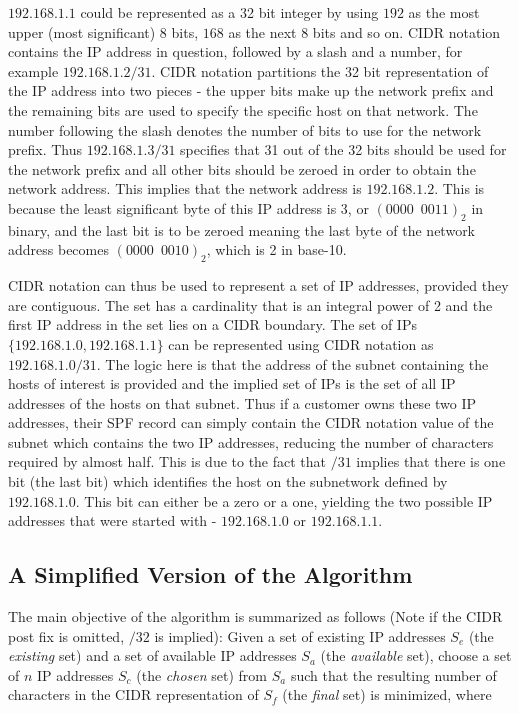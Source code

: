 $192.168.1.1$ could be represented as a 32 bit integer by using $192$ as the most upper (most significant) 8 bits, $168$ as the next 8 bits and so on. CIDR notation contains the IP address in question, followed by a slash and a number, for example $192.168.1.2/31$. CIDR notation partitions the 32 bit representation of the IP address into two pieces - the upper bits make up the network prefix and the remaining bits are used to specify the specific host on that network. The number following the slash denotes the number of bits to use for the network prefix. Thus $192.168.1.3/31$ specifies that 31 out of the 32 bits should be used for the network prefix and all other bits should be zeroed in order to obtain the network address. This implies that the network address is $192.168.1.2$. This is because the least significant byte of this IP address is 3, or $(0000\enspace0011)_2$ in binary, and the last bit is to be zeroed meaning the last byte of the network address becomes $(0000\enspace0010)_2$, which is 2 in base-10. 

CIDR notation can thus be used to represent a set of IP addresses, provided they are contiguous. The set has a cardinality that is an integral power of 2 and the first IP address in the set lies on a CIDR boundary. The set of IPs $\{192.168.1.0, 192.168.1.1\}$ can be represented using CIDR notation as $192.168.1.0/31$. The logic here is that the address of the subnet containing the hosts of interest is provided and the implied set of IPs is the set of all IP addresses of the hosts on that subnet.  Thus if a customer owns these two IP addresses, their SPF record can simply contain the CIDR notation value of the subnet which contains the two IP addresses, reducing the number of characters required by almost half. This is due to the fact that $/31$ implies that there is one bit (the last bit) which identifies the host on the subnetwork defined by $192.168.1.0$. This bit can either be a zero or a one, yielding the two possible IP addresses that were started with - $192.168.1.0$ or $192.168.1.1$.

\subsection{A Simplified Version of the Algorithm}
The main objective of the algorithm is summarized as follows (Note if the CIDR post fix is omitted, $/32$ is implied): \hfill\break\break
Given a set of existing IP addresses $S_e$ (the \textit{existing} set) and a set of available IP addresses $S_a$ (the \textit{available} set), choose a set of $n$ IP addresses $S_c$ (the \textit{chosen} set) from $S_a$ such that the resulting number of characters in the CIDR representation of $S_f$ (the \textit{final} set) is minimized, where 

